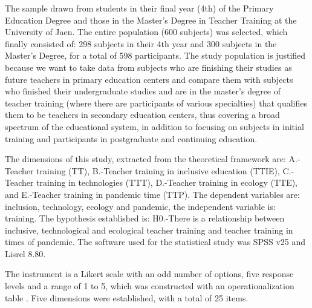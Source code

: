 \documentclass{textolivre}
\begin{document}
The sample drawn from students in their final year (4th) of the Primary Education Degree and those in the Master's Degree in Teacher Training at the University of Jaen. The entire population (600 subjects) was selected, which finally consisted of: 298 subjects in their 4th year and 300 subjects in the Master's Degree, for a total of 598 participants. The study population is justified because we want to take data from subjects who are finishing their studies as future teachers in primary education centers and compare them with subjects who finished their undergraduate studies and are in the master's degree of teacher training (where there are participants of various specialties) that qualifies them to be teachers in secondary education centers, thus covering a broad spectrum of the educational system, in addition to focusing on subjects in initial training and participants in postgraduate and continuing education.

The dimensions of this study, extracted from the theoretical framework are: A.-Teacher training (TT), B.-Teacher training in inclusive education (TTIE), C.-Teacher training in technologies (TTT), D.-Teacher training in ecology (TTE), and E.-Teacher training in pandemic time (TTP). The dependent variables are: inclusion, technology, ecology and pandemic, the independent variable is: training. The hypothesis established is: H0.-There is a relationship between inclusive, technological and ecological teacher training and teacher training in times of pandemic. The software used for the statistical study was SPSS v25 and Lisrel 8.80.

The instrument is a Likert scale with an odd number of options, five response levels and a range of 1 to 5, which was constructed with an operationalization table . Five dimensions were established, with a total of 25 items.
\end{document}
